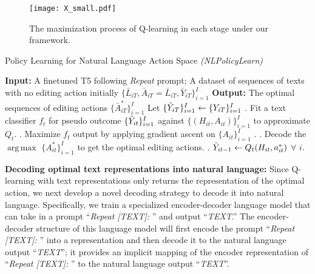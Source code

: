 \documentclass{article}
\DeclareMathOperator*{\argmax}{arg\,max}
\begin{document}
\begin{figure}[h]
\begin{small}
    \centering
    \texttt{[image: X\_small.pdf]}
    \caption{The maximization process of Q-learning in each stage under our framework.}
    \label{fig:gen-max}
    \end{small}
\end{figure}

\begin{algorithm}
\begin{small}
\caption{Policy Learning for Natural Language Action Space {\it (NLPolicyLearn)}}
\begin{algorithmic}
    \State \textbf{Input:} A finetuned T5 following \textit{Repeat} prompt; A dataset of sequences of texts with no editing action initially $\{\bar{L}_{iT}, \bar{A}_{iT}=\bar{L}_{iT},\bar{Y}_{iT}\}_{i=1}^{I}$ 
    \State \textbf{Output:} The optimal sequences of editing actions $\{\bar{A}^*_{iT}\}_{i=1}^I$ 
    \State Let $\{\Tilde{Y}_{iT}\}_{i=1}^I \leftarrow \{Y_{iT}\}_{i=1}^I$
        . Fit a text classifier $f_{t}$ for pseudo outcome $\{\Tilde{Y}_{it}\}_{i=1}^I$ against $\{(H_{it},A_{it})\}_{i=1}^I$ to approximate $Q_t$.
        . Maximize $f_t$ output by applying gradient ascent on $\{A_{it}\}_{i=1}^I$ .
        . Decode the $\argmax$ $\{A^*_{it}\}_{i=1}^I$ to get the optimal editing actions.
        . $\Tilde{Y}_{it-1} \leftarrow Q_t(H_{it},a^*_{it})$ $\forall$ $i$.
    \EndFor
\end{algorithmic}\label{alg:p-learn}
\end{small}
\end{algorithm}



\textbf{Decoding optimal text representations into natural language:} Since Q-learning with text representations only returns the representation of the optimal action, we next develop a novel decoding strategy to decode it into natural language. Specifically, we train a specialized encoder-decoder language model that can take in a prompt ``\textit{Repeat [TEXT]: }'' and output ``\textit{TEXT}.'' The encoder-decoder structure of this language model will first encode the prompt ``\textit{Repeat [TEXT]: }'' into a representation and then decode it to the natural language output ``\textit{TEXT}''; it provides an implicit mapping of the encoder representation of ``\textit{Repeat [TEXT]: }'' to the natural language output ``\textit{TEXT}''.
\end{document}
